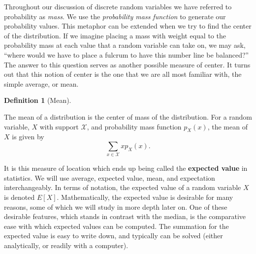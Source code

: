 \documentclass[
  letterpaper,
  DIV=11,
  numbers=noendperiod]{scrreprt}
\theoremstyle{definition}
\theoremstyle{definition}
\theoremstyle{definition}
\newtheorem{definition}{Definition}[chapter]
\theoremstyle{remark}
\begin{document}
Throughout our discussion of discrete random variables we have referred
to probability as \emph{mass}. We use the \emph{probability mass
function} to generate our probability values. This metaphor can be
extended when we try to find the center of the distribution. If we
imagine placing a mass with weight equal to the probability mass at each
value that a random variable can take on, we may ask, ``where would we
have to place a fulcrum to have this number line be balanced?'' The
answer to this question serves as another possible measure of center. It
turns out that this notion of center is the one that we are all most
familiar with, the simple average, or mean.

\begin{definition}[Mean]\protect\hypertarget{def-mean}{}\label{def-mean}

The mean of a distribution is the center of mass of the distribution.
For a random variable, \(X\) with support \(\mathcal{X}\), and
probability mass function \(p_X(x)\), the mean of \(X\) is given by
\[\sum_{x \in \mathcal{X}} xp_X(x).\]

\end{definition}

It is this measure of location which ends up being called the
\textbf{expected value} in statistics. We will use average, expected
value, mean, and expectation interchangeably. In terms of notation, the
expected value of a random variable \(X\) is denoted \(E[X]\).
Mathematically, the expected value is desirable for many reasons, some
of which we will study in more depth later on. One of these desirable
features, which stands in contrast with the median, is the comparative
ease with which expected values can be computed. The summation for the
expected value is easy to write down, and typically can be solved
(either analytically, or readily with a computer).
\end{document}
